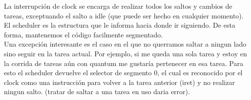 La interrupci\'on de clock se encarga de realizar todos los saltos y cambios de tareas, exceptuando el salto a idle (que puede ser hecho 
en cualquier momento). El scheduler es la estructura que le informa hacia donde ir siguiendo. De esta forma, mantenemos el c\'odigo facilmente 
segmentado.\\

Una excepci\'on interesante es el caso en el que no querramos saltar a ningun lado sino seguir en la tarea actual. Por ejemplo, si me 
queda una sola tarea y estoy en la corrida de tareas a\'un con quantum me gustar\'ia pertenecer en esa tarea. Para esto el scheduler 
devuelve el selector de segmento 0, el cual es reconocido por el clock como una instrucci\'on para volver a la tarea anterior (iret) 
y no realizar ningun salto. (tratar de saltar a una tarea en uso daria error).
